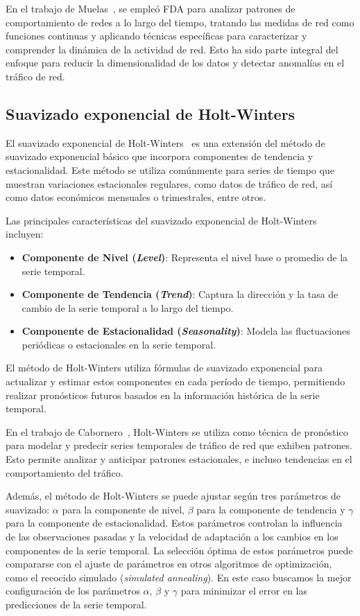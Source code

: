 En el trabajo de Muelas~\cite{muelas2015}, se empleó FDA para analizar patrones de comportamiento de redes a lo largo del tiempo, tratando las medidas de red como funciones continuas y aplicando técnicas específicas para caracterizar y comprender la dinámica de la actividad de red. Esto ha sido parte integral del enfoque para reducir la dimensionalidad de los datos y detectar anomalías en el tráfico de red.

\subsection{Suavizado exponencial de Holt-Winters} %
El suavizado exponencial de Holt-Winters~\cite{chatfield1978holt} es una extensión del método de suavizado exponencial básico que incorpora componentes de tendencia y estacionalidad. Este método se utiliza comúnmente para series de tiempo que muestran variaciones estacionales regulares, como datos de tráfico de red, así como datos económicos mensuales o trimestrales, entre otros.

Las principales características del suavizado exponencial de Holt-Winters incluyen:
\begin{itemize}
    \item \textbf{Componente de Nivel (\textit{Level})}: Representa el nivel base o promedio de la serie temporal.
    \item \textbf{Componente de Tendencia (\textit{Trend})}: Captura la dirección y la tasa de cambio de la serie temporal a lo largo del tiempo.
    \item \textbf{Componente de Estacionalidad (\textit{Seasonality})}: Modela las fluctuaciones periódicas o estacionales en la serie temporal.
\end{itemize}
El método de Holt-Winters utiliza fórmulas de suavizado exponencial para actualizar y estimar estos componentes en cada período de tiempo, permitiendo realizar pronósticos futuros basados en la información histórica de la serie temporal. 

En el trabajo de Cabornero~\cite{cabornero2021}, Holt-Winters se utiliza como técnica de pronóstico para modelar y predecir series temporales de tráfico de red que exhiben patrones. Esto permite analizar y anticipar patrones estacionales, e incluso tendencias en el comportamiento del tráfico.

Además, el método de Holt-Winters se puede ajustar según tres parámetros de suavizado: $\alpha$ para la componente de nivel, $\beta$ para la componente de tendencia y $\gamma$ para la componente de estacionalidad. Estos parámetros controlan la influencia de las observaciones pasadas y la velocidad de adaptación a los cambios en los componentes de la serie temporal. La selección óptima de estos parámetros puede compararse con el ajuste de parámetros en otros algoritmos de optimización, como el recocido simulado (\textit{simulated annealing}). En este caso buscamos la mejor configuración de los parámetros $\alpha$, $\beta$ y $\gamma$ para minimizar el error en las predicciones de la serie temporal.

